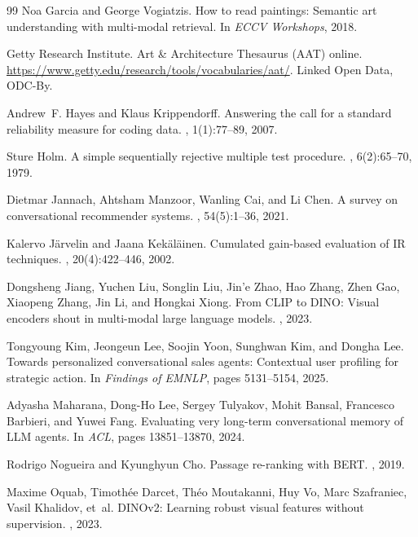 \documentclass[10pt,twocolumn,letterpaper]{article}
\begin{document}
\begin{thebibliography}{99}
Noa Garcia and George Vogiatzis.
\newblock How to read paintings: Semantic art understanding with multi-modal retrieval.
\newblock In {\em ECCV Workshops}, 2018.

Getty Research Institute.
\newblock Art \& Architecture Thesaurus (AAT) online.
\newblock \url{https://www.getty.edu/research/tools/vocabularies/aat/}. Linked Open Data, ODC-By.

Andrew~F. Hayes and Klaus Krippendorff.
\newblock Answering the call for a standard reliability measure for coding data.
, 1(1):77--89, 2007.

Sture Holm.
\newblock A simple sequentially rejective multiple test procedure.
, 6(2):65--70, 1979.

Dietmar Jannach, Ahtsham Manzoor, Wanling Cai, and Li Chen.
\newblock A survey on conversational recommender systems.
, 54(5):1--36, 2021.

Kalervo J{\"a}rvelin and Jaana Kek{\"a}l{\"a}inen.
\newblock Cumulated gain-based evaluation of IR techniques.
, 20(4):422--446, 2002.

Dongsheng Jiang, Yuchen Liu, Songlin Liu, Jin'e Zhao, Hao Zhang, Zhen Gao, Xiaopeng Zhang, Jin Li, and Hongkai Xiong.
\newblock From CLIP to DINO: Visual encoders shout in multi-modal large language models.
, 2023.

Tongyoung Kim, Jeongeun Lee, Soojin Yoon, Sunghwan Kim, and Dongha Lee.
\newblock Towards personalized conversational sales agents: Contextual user profiling for strategic action.
\newblock In {\em Findings of EMNLP}, pages 5131--5154, 2025.

Adyasha Maharana, Dong-Ho Lee, Sergey Tulyakov, Mohit Bansal, Francesco Barbieri, and Yuwei Fang.
\newblock Evaluating very long-term conversational memory of LLM agents.
\newblock In {\em ACL}, pages 13851--13870, 2024.

Rodrigo Nogueira and Kyunghyun Cho.
\newblock Passage re-ranking with BERT.
, 2019.

Maxime Oquab, Timoth{\'e}e Darcet, Th{\'e}o Moutakanni, Huy Vo, Marc Szafraniec, Vasil Khalidov, et~al.
\newblock DINOv2: Learning robust visual features without supervision.
, 2023.


\end{thebibliography}
\end{document}

